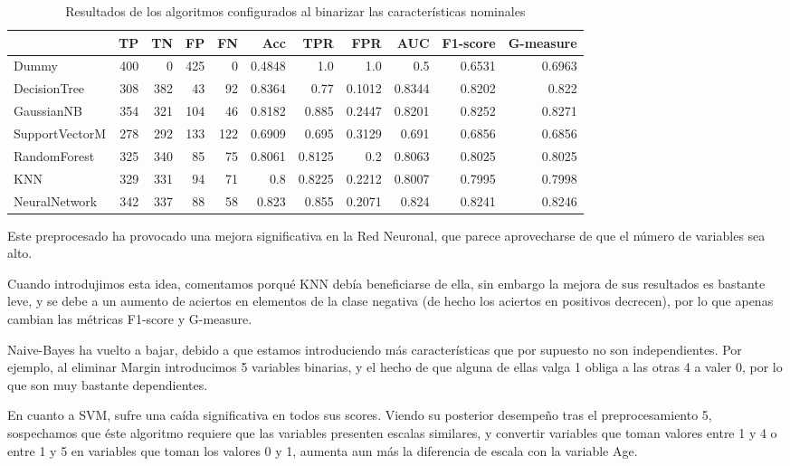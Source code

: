 \documentclass{article}
\begin{document}
\begin{table}[H]
\centering
\caption{Resultados de los algoritmos configurados al binarizar las características nominales}
\label{tab:res-binarization}
\begin{tabular}{|lrrrrrrrrrr|}
\hline
 & TP & TN & FP & FN & Acc & TPR & FPR & AUC & F1-score & G-measure\\ \hline
Dummy & 400 & 0 & 425 & 0 & 0.4848 & 1.0 & 1.0 & 0.5 & 0.6531 & 0.6963\\
DecisionTree & 308 & 382 & 43 & 92 & 0.8364 & 0.77 & 0.1012 & 0.8344 & 0.8202 & 0.822\\
GaussianNB & 354 & 321 & 104 & 46 & 0.8182 & 0.885 & 0.2447 & 0.8201 & 0.8252 & 0.8271\\
SupportVectorM & 278 & 292 & 133 & 122 & 0.6909 & 0.695 & 0.3129 & 0.691 & 0.6856 & 0.6856\\
RandomForest & 325 & 340 & 85 & 75 & 0.8061 & 0.8125 & 0.2 & 0.8063 & 0.8025 & 0.8025\\
KNN & 329 & 331 & 94 & 71 & 0.8 & 0.8225 & 0.2212 & 0.8007 & 0.7995 & 0.7998\\
NeuralNetwork & 342 & 337 & 88 & 58 & 0.823 & 0.855 & 0.2071 & 0.824 & 0.8241 & 0.8246\\
\hline
\end{tabular}
\end{table}

Este preprocesado ha provocado una mejora significativa en la Red
Neuronal, que parece aprovecharse de que el número de variables sea
alto.

Cuando introdujimos esta idea, comentamos porqué KNN debía
beneficiarse de ella, sin embargo la mejora de sus resultados es
bastante leve, y se debe a un aumento de aciertos en elementos de la
clase negativa (de hecho los aciertos en positivos decrecen), por lo
que apenas cambian las métricas F1-score y G-measure.

Naive-Bayes ha vuelto a bajar, debido a que estamos introduciendo más
características que por supuesto no son independientes. Por ejemplo,
al eliminar Margin introducimos 5 variables binarias, y el hecho de
que alguna de ellas valga 1 obliga a las otras 4 a valer 0, por lo que
son muy bastante dependientes.

En cuanto a SVM, sufre una caída significativa en todos sus scores.
Viendo su posterior desempeño tras el preprocesamiento 5, sospechamos
que éste algoritmo requiere que las variables presenten escalas
similares, y convertir variables que toman valores entre 1 y 4 o entre
1 y 5 en variables que toman los valores 0 y 1, aumenta aun más la
diferencia de escala con la variable Age.
\end{document}
